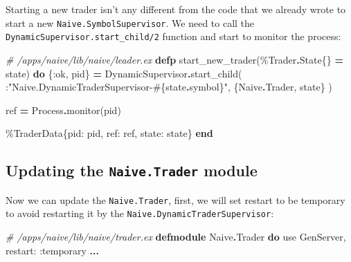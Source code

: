 \documentclass[
  oneside]{book}
\newenvironment{Shaded}{\begin{snugshade}}{\end{snugshade}}
\newcommand{\CommentTok}[1]{\textcolor[rgb]{0.56,0.35,0.01}{\textit{#1}}}
\newcommand{\ConstantTok}[1]{\textcolor[rgb]{0.00,0.00,0.00}{#1}}
\newcommand{\ImportTok}[1]{#1}
\newcommand{\KeywordTok}[1]{\textcolor[rgb]{0.13,0.29,0.53}{\textbf{#1}}}
\newcommand{\NormalTok}[1]{#1}
\newcommand{\OperatorTok}[1]{\textcolor[rgb]{0.81,0.36,0.00}{\textbf{#1}}}
\newcommand{\OtherTok}[1]{\textcolor[rgb]{0.56,0.35,0.01}{#1}}
\newcommand{\StringTok}[1]{\textcolor[rgb]{0.31,0.60,0.02}{#1}}
\newcommand{\VariableTok}[1]{\textcolor[rgb]{0.00,0.00,0.00}{#1}}
\begin{document}
Starting a new trader isn't any different from the code that we already wrote to start a new \texttt{Naive.SymbolSupervisor}. We need to call the \texttt{DynamicSupervisor.start\_child/2} function and start to monitor the process:

\begin{Shaded}
\begin{Highlighting}[]
  \CommentTok{\# /apps/naive/lib/naive/leader.ex}
  \KeywordTok{defp}\NormalTok{ start\_new\_trader(\%}\ConstantTok{Trader}\OperatorTok{.}\ConstantTok{State}\NormalTok{\{\} }\OperatorTok{=}\NormalTok{ state) }\KeywordTok{do}
\NormalTok{    \{}\VariableTok{:ok}\NormalTok{, pid\} }\OperatorTok{=}
      \ConstantTok{DynamicSupervisor}\OperatorTok{.}\NormalTok{start\_child(}
\NormalTok{        :}\StringTok{"Naive.DynamicTraderSupervisor{-}}\OtherTok{\#\{}\NormalTok{state}\OperatorTok{.}\NormalTok{symbol}\OtherTok{\}}\StringTok{"}\NormalTok{,}
\NormalTok{        \{}\ConstantTok{Naive}\OperatorTok{.}\ConstantTok{Trader}\NormalTok{, state\}}
\NormalTok{      )}

\NormalTok{    ref }\OperatorTok{=} \ConstantTok{Process}\OperatorTok{.}\NormalTok{monitor(pid)}

\NormalTok{    \%}\ConstantTok{TraderData}\NormalTok{\{}\VariableTok{pid:}\NormalTok{ pid, }\VariableTok{ref:}\NormalTok{ ref, }\VariableTok{state:}\NormalTok{ state\}}
  \KeywordTok{end}
\end{Highlighting}
\end{Shaded}

\hypertarget{updating-the-naive.trader-module}{%
\subsection{\texorpdfstring{Updating the \texttt{Naive.Trader} module}{Updating the Naive.Trader module}}\label{updating-the-naive.trader-module}}

Now we can update the \texttt{Naive.Trader}, first, we will set restart to be temporary to avoid restarting it by the \texttt{Naive.DynamicTraderSupervisor}:

\begin{Shaded}
\begin{Highlighting}[]
\CommentTok{\# /apps/naive/lib/naive/trader.ex}
\KeywordTok{defmodule} \ConstantTok{Naive}\OperatorTok{.}\ConstantTok{Trader} \KeywordTok{do}
  \ImportTok{use} \ConstantTok{GenServer}\NormalTok{, }\VariableTok{restart:} \VariableTok{:temporary}
  \OperatorTok{...}
\end{Highlighting}
\end{Shaded}
\end{document}
